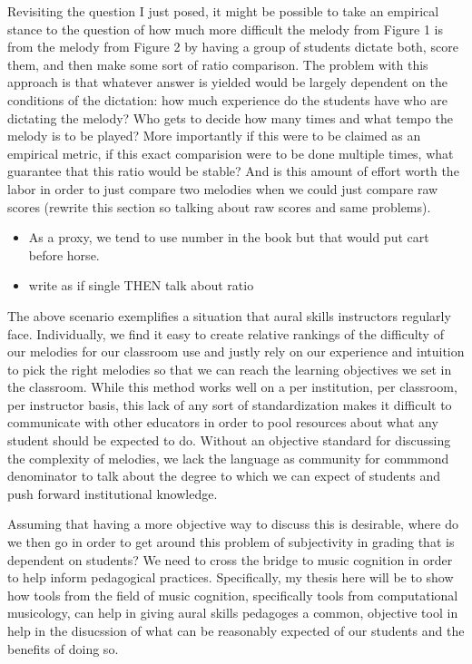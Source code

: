 \documentclass[english,man,floatsintext]{apa6}
\begin{document}
Revisiting the question I just posed, it might be possible to take an empirical stance to the question of how much more difficult the melody from Figure 1 is from the melody from Figure 2 by having a group of students dictate both, score them, and then make some sort of ratio comparison.
The problem with this approach is that whatever answer is yielded would be largely dependent on the conditions of the dictation: how much experience do the students have who are dictating the melody? Who gets to decide how many times and what tempo the melody is to be played?
More importantly if this were to be claimed as an empirical metric, if this exact comparision were to be done multiple times, what guarantee that this ratio would be stable?
And is this amount of effort worth the labor in order to just compare two melodies when we could just compare raw scores (rewrite this section so talking about raw scores and same problems).

\begin{itemize}
\item
  As a proxy, we tend to use number in the book but that would put cart before horse.
\item
  write as if single THEN talk about ratio
\end{itemize}

The above scenario exemplifies a situation that aural skills instructors regularly face.
Individually, we find it easy to create relative rankings of the difficulty of our melodies for our classroom use and justly rely on our experience and intuition to pick the right melodies so that we can reach the learning objectives we set in the classroom.
While this method works well on a per institution, per classroom, per instructor basis, this lack of any sort of standardization makes it difficult to communicate with other educators in order to pool resources about what any student should be expected to do.
Without an objective standard for discussing the complexity of melodies, we lack the language as community for commmond denominator to talk about the degree to which we can expect of students and push forward institutional knowledge.

Assuming that having a more objective way to discuss this is desirable, where do we then go in order to get around this problem of subjectivity in grading that is dependent on students?
We need to cross the bridge to music cognition in order to help inform pedagogical practices.
Specifically, my thesis here will be to show how tools from the field of music cognition, specifically tools from computational musicology, can help in giving aural skills pedagoges a common, objective tool in help in the disucssion of what can be reasonably expected of our students and the benefits of doing so.
\end{document}
